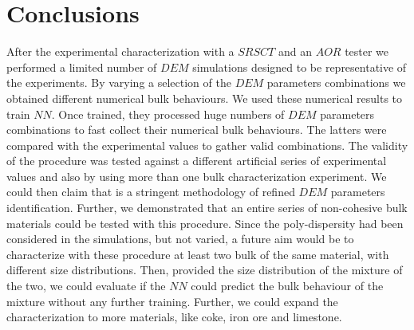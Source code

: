 \section{Conclusions}
\label{sec:conclusions}
After the experimental characterization with a $SRSCT$ and an $AOR$ tester we performed a 
limited number of $DEM$ simulations designed to be representative of the experiments. 
By varying a selection of the $DEM$ parameters combinations we obtained different numerical bulk behaviours. 
We used these numerical results to train $NN$. Once trained, they processed huge 
numbers of $DEM$ parameters combinations to fast collect their numerical bulk behaviours. 
The latters were compared with the experimental values to gather valid combinations. 
The validity of the procedure was tested against a different artificial series of experimental 
values and also by using more than one bulk characterization experiment. 
We could then claim that is a stringent methodology of refined $DEM$ parameters identification. 
Further, we demonstrated that an entire series of non-cohesive bulk materials could be tested with this procedure.
Since the poly-dispersity had been considered in the simulations, but not varied, a future aim would 
be to characterize with these procedure at least two bulk of the same material, with different size distributions. 
Then, provided the size distribution of the mixture of the two, we could evaluate if the $NN$ could predict 
the bulk behaviour of the mixture without any further training. 
Further, we could expand the characterization to more materials, like coke, iron
ore and limestone.

